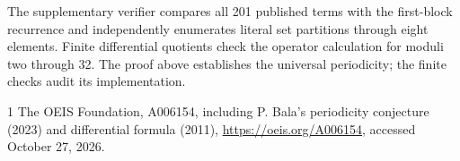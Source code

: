 \documentclass[10pt]{article}
\begin{document}
The supplementary verifier compares all 201 published terms with
the first-block recurrence and independently enumerates literal
set partitions through eight elements. Finite differential quotients
check the operator calculation for moduli two through 32. The
proof above establishes the universal periodicity; the finite
checks audit its implementation.
\begin{thebibliography}{1}
 The OEIS Foundation, A006154, including P. Bala's
periodicity conjecture (2023) and differential formula (2011),
\url{https://oeis.org/A006154}, accessed October 27, 2026.
\end{thebibliography}
\end{document}
